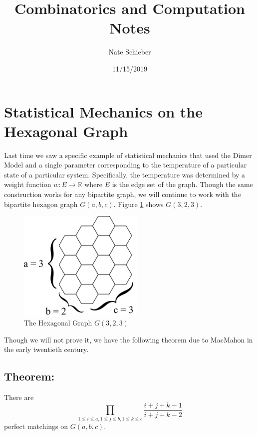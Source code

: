 \documentclass{article}
\begin{document}
	
	\title{Combinatorics and Computation Notes}
	\author{Nate Schieber}
	\date{11/15/2019}
	\maketitle
	
	\section{Statistical Mechanics on the Hexagonal Graph}
	
	\hspace{1cm} Last time we saw a specific example of statistical mechanics that used the Dimer Model and a single parameter corresponding to the temperature of a particular state of a particular system. Specifically, the temperature was determined by a weight function $w: E \rightarrow \mathbb{R}$ where $E$ is the edge set of the graph. Though the same construction works for any bipartite graph, we will continue to work with the bipartite hexagon graph $G(a,b,c)$. Figure \ref{fig:hexagraph} shows $G(3,2,3)$. 
	
	

	\begin{figure}[h]
\begin{minipage}{\textwidth}
	\begin{center}
 	\includegraphics[width=6cm]{hexagraph.png}
  	\caption{The Hexagonal Graph $G(3,2,3)$}
	 \label{fig:hexagraph}
 	 \end{center}
 \end{minipage}	
\end{figure} 

	
	Though we will not prove it, we have the following theorem due to MacMahon in the early twentieth century. 
	\subsection{Theorem:} There are
	$$
	\prod_{
	1 \leq i \leq a, 1 \leq j \leq b, 1 \leq k \leq c} \frac{i+j+k-1}{i+j+k-2} 
	$$
	perfect matchings on $G(a,b,c)$. 
	
\end{document}
